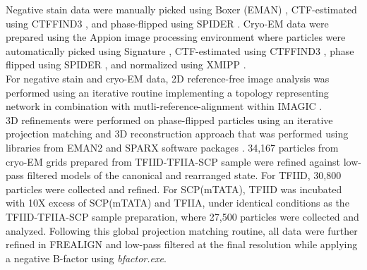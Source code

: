 Negative stain data were manually picked using Boxer (EMAN) \cite{Ludtke_2307}, CTF-estimated using CTFFIND3 \cite{Mindell_1684}, and phase-flipped using SPIDER \cite{Frank_2988}. Cryo-EM data were prepared using the Appion image processing environment \cite{Lander_614} where particles were automatically picked using Signature \cite{Chen_1041}, CTF-estimated using CTFFIND3 \cite{Mindell_1684}, phase flipped using SPIDER \cite{Frank_2988}, and normalized using XMIPP \cite{Sorzano_1492}.\\
\indent For negative stain and cryo-EM data, 2D reference-free image analysis was performed using an iterative routine implementing a topology representing network \cite{Ogura_1656} in combination with mutli-reference-alignment within IMAGIC \cite{va_2849}. \\
\indent 3D refinements were performed on phase-flipped particles using an iterative projection matching and 3D reconstruction approach that was performed using libraries from EMAN2 and SPARX software packages \cite{Hohn_913,Tang_849}. 34,167 particles from cryo-EM grids prepared from TFIID-TFIIA-SCP sample were refined against low-pass filtered models of the canonical and rearranged state. For TFIID, 30,800 particles were collected and refined. For SCP(mTATA), TFIID was incubated with 10X excess of SCP(mTATA) and TFIIA, under identical conditions as the TFIID-TFIIA-SCP sample preparation, where 27,500 particles were collected and analyzed. Following this global projection matching routine, all data were further refined in FREALIGN \cite{Grigorieff_982} and low-pass filtered at the final resolution while applying a negative B-factor using \emph{bfactor.exe}. \\

